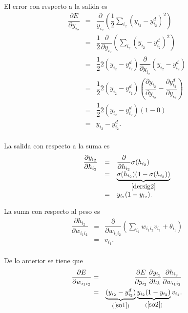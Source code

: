 \documentclass[11pt,letterpaper]{article}
\theoremstyle{definition}
\theoremstyle{definition}
\theoremstyle{definition}
\theoremstyle{definition}
\theoremstyle{definition}
\theoremstyle{definition}
\theoremstyle{definition}
\theoremstyle{definition}
\begin{document}
El error con respecto a la salida es
\begin{equation}\label{so1}
	\begin{array}{lll}
		\dfrac{\partial E}{\partial y_{i_2}}&=&\dfrac{\partial }{y_{i_2}}\left( \dfrac{1}{2}\displaystyle\sum_{i_2} (y_{i_2}-y_{i_2}^d)^2 \right)\\
		&=&\dfrac{1}{2} \dfrac{\partial}{\partial y_{i_2}}\left(\displaystyle\sum_{i_2} (y_{i_2}-y_{i_2}^d)^2 \right) \\
		&=&\dfrac{1}{2} 2 (y_{i_2}-y_{i_2}^d)\dfrac{\partial }{\partial y_{i_2}} (y_{i_2}-y_{i_2}^d)\\
		&=&\dfrac{1}{2} 2 (y_{i_2}-y_{i_2}^d)\left( \dfrac{\partial y_{i_2}}{\partial y_{i_2}} - \dfrac{\partial y_{i_2}^d}{\partial y_{i_2}} \right)\\
		&=&\dfrac{1}{2} 2 (y_{i_2}-y_{i_2}^d)\left( 1-0 \right)\\
		&=&y_{i_2}-y_{i_2}^d.\\
	\end{array}
\end{equation}

La salida con respecto a la suma es
\begin{equation}\label{so2}
	\begin{array}{lll}
		\dfrac{\partial y_{i_2}}{\partial h_{i_2}}&=&\dfrac{\partial} {\partial h_{i_2}} \sigma(h_{i_2})\\
		&=&\underbrace{\sigma(h_{i_2})(1-\sigma(h_{i_2}))}_{\ref{dersig2}} \\
		&=&y_{i_2}(1-y_{i_2}).\\
	\end{array}
\end{equation}

La suma con respecto al peso es
\begin{equation}\label{so3}
	\begin{array}{lll}
		\dfrac{\partial h_{i_2}}{\partial w_{i_1 i_2}}&=&\dfrac{\partial}{\partial w_{i_1 i_2}} \left(  \displaystyle\sum_{i_1} w_{i_1 i_2} v_{i_1} + \theta_{i_1} \right)\\
		&=&v_{i_1}.\\
	\end{array}
\end{equation}

De lo anterior se tiene que
\begin{eqnarray*}
	\dfrac{\partial E}{\partial w_{i_1 i_2}}&=&\dfrac{\partial E}{\partial y_{i_2}}\dfrac{\partial y_{i_2}}{\partial h_{k}}\dfrac{\partial h_{i_2}}{\partial w_{i_1 i_2}}\\
	&=&\underbrace{(y_{i_2}-y_{i_2}^d)}_{(\ref{so1})}\underbrace{y_{i_2}(1-y_{i_2})}_{(\ref{so2})}v_{i_1}.
\end{eqnarray*}
\end{document}
